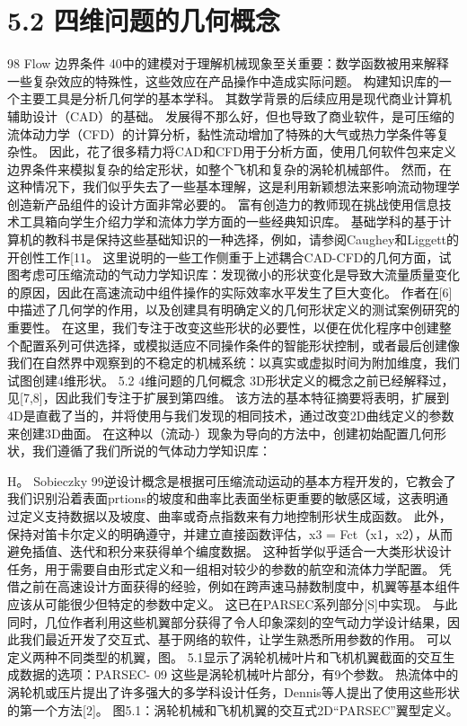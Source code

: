 \documentclass[UTF8,11pt,a4paper,openany,fontset=fandol]{ctexbook}
\begin{document}
\section{5.2 四维问题的几何概念}
98 Flow 边界条件 40中的建模对于理解机械现象至关重要：数学函数被用来解释一些复杂效应的特殊性，这些效应在产品操作中造成实际问题。 构建知识库的一个主要工具是分析几何学的基本学科。 其数学背景的后续应用是现代商业计算机辅助设计（CAD）的基础。 发展得不那么好，但也导致了商业软件，是可压缩的流体动力学（CFD）的计算分析，黏性流动增加了特殊的大气或热力学条件等复杂性。 因此，花了很多精力将CAD和CFD用于分析方面，使用几何软件包来定义边界条件来模拟复杂的给定形状，如整个飞机和复杂的涡轮机械部件。 然而，在这种情况下，我们似乎失去了一些基本理解，这是利用新颖想法来影响流动物理学创造新产品组件的设计方面非常必要的。 富有创造力的教师现在挑战使用信息技术工具箱向学生介绍力学和流体力学方面的一些经典知识库。 基础学科的基于计算机的教科书是保持这些基础知识的一种选择，例如，请参阅Caughey和Liggett的开创性工作[11。 这里说明的一些工作侧重于上述耦合CAD-CFD的几何方面，试图考虑可压缩流动的气动力学知识库：发现微小的形状变化是导致大流量质量变化的原因，因此在高速流动中组件操作的实际效率水平发生了巨大变化。 作者在[6]中描述了几何学的作用，以及创建具有明确定义的几何形状定义的测试案例研究的重要性。 在这里，我们专注于改变这些形状的必要性，以便在优化程序中创建整个配置系列可供选择，或模拟适应不同操作条件的智能形状控制，或者最后创建像我们在自然界中观察到的不稳定的机械系统：以真实或虚拟时间为附加维度，我们试图创建4维形状。 5.2 4维问题的几何概念 3D形状定义的概念之前已经解释过，见[7,8]，因此我们专注于扩展到第四维。 该方法的基本特征摘要将表明，扩展到4D是直截了当的，并将使用与我们发现的相同技术，通过改变2D曲线定义的参数来创建3D曲面。 在这种以（流动-）现象为导向的方法中，创建初始配置几何形状，我们遵循了我们所说的气体动力学知识库：

H。 Sobieczky 99逆设计概念是根据可压缩流动运动的基本方程开发的，它教会了我们识别沿着表面prtions的坡度和曲率比表面坐标更重要的敏感区域，这表明通过定义支持数据以及坡度、曲率或奇点指数来有力地控制形状生成函数。 此外，保持对笛卡尔定义的明确遵守，并建立直接函数评估，x3 = Fct（x1，x2），从而避免插值、迭代和积分来获得单个编度数据。 这种哲学似乎适合一大类形状设计任务，用于需要自由形式定义和一组相对较少的参数的航空和流体力学配置。 凭借之前在高速设计方面获得的经验，例如在跨声速马赫数制度中，机翼等基本组件应该从可能很少但特定的参数中定义。 这已在PARSEC系列部分[S]中实现。 与此同时，几位作者利用这些机翼部分获得了令人印象深刻的空气动力学设计结果，因此我们最近开发了交互式、基于网络的软件，让学生熟悉所用参数的作用。 可以定义两种不同类型的机翼，图。 5.1显示了涡轮机械叶片和飞机机翼截面的交互生成数据的选项：PARSEC- 09 这些是涡轮机械叶片部分，有9个参数。 热流体中的涡轮机或压片提出了许多强大的多学科设计任务，Dennis等人提出了使用这些形状的第一个方法[2]。 图5.1：涡轮机械和飞机机翼的交互式2D“PARSEC”翼型定义。
\end{document}
